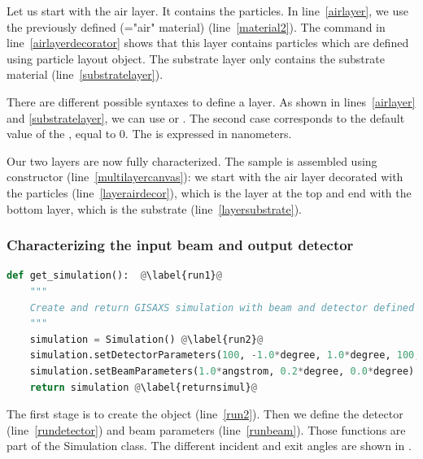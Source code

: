 Let us start with the air layer. It contains the particles. In
line~\ref{airlayer}, we use the previously defined 
(="air" material) (line~\ref{material2}). The command in line~\ref{airlayerdecorator} shows that this layer contains particles
which are defined using particle layout object. The substrate layer
only contains the substrate material (line~\ref{substratelayer}).
 
There are different possible syntaxes to define a layer. As shown in
lines~\ref{airlayer} and \ref{substratelayer}, we can use
 or
. The second case corresponds
to the default value of the , equal to 0. The  is
expressed in  nanometers.

Our two layers are now fully characterized. The sample is assembled using
 constructor (line~\ref{multilayercanvas}): we start with the air layer decorated
with the particles (line~\ref{layerairdecor}), which is the layer at
the top and end with the bottom layer, which is the
substrate (line~\ref{layersubstrate}).

\subsubsection{Characterizing the input beam and output detector}

\begin{lstlisting}[language=python, style=eclipseboxed,name=ex1,nolol]
def get_simulation():  @\label{run1}@
    """
    Create and return GISAXS simulation with beam and detector defined
    """
    simulation = Simulation() @\label{run2}@
    simulation.setDetectorParameters(100, -1.0*degree, 1.0*degree, 100, 0.0*degree, 2.0*degree) @\label{rundetector}@
    simulation.setBeamParameters(1.0*angstrom, 0.2*degree, 0.0*degree) @\label{runbeam}@
    return simulation @\label{returnsimul}@
\end{lstlisting}
The first stage is to create the  object (line~\ref{run2}). Then we define the detector (line~\ref{rundetector}) and beam
parameters (line~\ref{runbeam}). %
Those functions are part of the Simulation
class.  The different incident and exit angles are
shown in .


